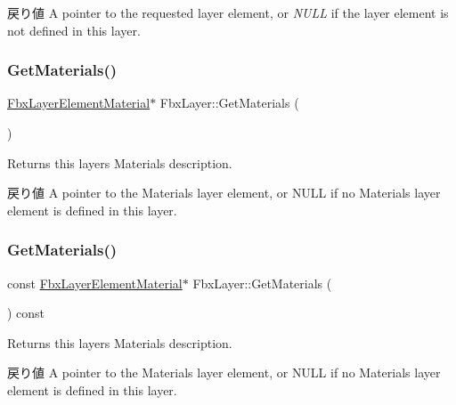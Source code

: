 \begin{DoxyReturn}{戻り値}
A pointer to the requested layer element, or {\itshape N\+U\+LL} if the layer element is not defined in this layer. 
\end{DoxyReturn}
\mbox{\label{class_fbx_layer_acb250792d05dbe8dde9a44d8d2ddea50}} 
\subsubsection{\texorpdfstring{Get\+Materials()}{GetMaterials()}\hspace{0.1cm}{\footnotesize\ttfamily [1/2]}}
{\footnotesize\ttfamily \hyperlink{class_fbx_layer_element_material}{Fbx\+Layer\+Element\+Material}$\ast$ Fbx\+Layer\+::\+Get\+Materials (\begin{DoxyParamCaption}{ }\end{DoxyParamCaption})}

Returns this layer\textquotesingle{}s Materials description. \begin{DoxyReturn}{戻り値}
A pointer to the Materials layer element, or {\ttfamily N\+U\+LL} if no Materials layer element is defined in this layer. 
\end{DoxyReturn}
\mbox{\label{class_fbx_layer_a81d54784c6b6b5298c03263b4261e577}} 
\subsubsection{\texorpdfstring{Get\+Materials()}{GetMaterials()}\hspace{0.1cm}{\footnotesize\ttfamily [2/2]}}
{\footnotesize\ttfamily const \hyperlink{class_fbx_layer_element_material}{Fbx\+Layer\+Element\+Material}$\ast$ Fbx\+Layer\+::\+Get\+Materials (\begin{DoxyParamCaption}{ }\end{DoxyParamCaption}) const}

Returns this layer\textquotesingle{}s Materials description. \begin{DoxyReturn}{戻り値}
A pointer to the Materials layer element, or {\ttfamily N\+U\+LL} if no Materials layer element is defined in this layer. 
\end{DoxyReturn}
\mbox{\label{class_fbx_layer_ae29a7357ab32d3a298d85940e703b65d}} 
